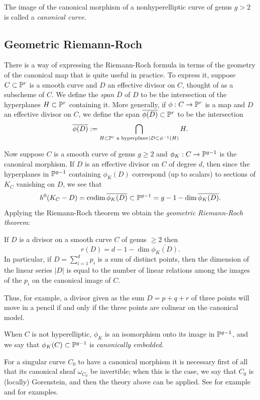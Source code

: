 The image of the canonical morphism of a nonhyperelliptic curve of genus $g>2$ is called a \emph{canonical curve}.


\subsection{Geometric Riemann-Roch}

There is a way of expressing the Riemann-Roch formula in terms of the geometry of the canonical map that is quite useful in practice. To express it, suppose $C \subset {\mathbb P}^r$ is a smooth curve and $D$ an effective divisor on $C$, thought of as a subscheme of $C$. We define the \emph{span} $\overline D$ of $D$ to be the intersection of the hyperplanes $H \subset {\mathbb P}^r$ containing it. More generally, if $\phi : C \to {\mathbb P}^r$ is a map and $D$ an effective divisor on $C$, we define the span $\overline{\phi(D)} \subset {\mathbb P}^r$ to be the intersection
$$
\overline{\phi(D)} := \bigcap_{H \subset {\mathbb P}^r \text{ a hyperplane}\kern1pt \mid D \subset \phi^{-1}(H)} H.
$$

Now suppose $C$ is a smooth curve of genus $g\geq 2$ and $\phi_K: C\to {\mathbb P}^{g-1}$ is the canonical morphism.
If  $D$ is an effective divisor on $C$ of degree $d$, then since the hyperplanes in ${\mathbb P}^{g-1}$ containing $\phi_K(D)$ correspond (up to scalars) to sections of $K_C$ vanishing on $D$, we see that
$$
h^0(K_C-D) = \operatorname{codim} \overline{ \phi_K(D)} \subset {\mathbb P}^{g-1}= g - 1 - \dim \overline{ \phi_K(D)}.
$$
Applying the Riemann-Roch theorem we obtain  the \emph{geometric Riemann-Roch theorem}:

\begin{corollary}\label{geometric RR}
If $D$ is a divisor on a smooth curve $C$ of genus $\geq 2$ then
$$
r(D) = d - 1 - \dim \overline{ \phi_K(D)}.
$$
In particular, if $D = \sum_{i=1}^dp_i$ is a sum of distinct points, then
 the dimension of the linear series $|D|$  is equal to the number of linear relations among the images of the $p_i$ on the canonical 
 image of $C$.
\end{corollary}

Thus, for example, a divisor given as the sum $D = p+q+r$ of three points will move in a pencil if and only if the three points are colinear on the canonical model.

When $C$ is not hyperelliptic, $\phi_K$ is an isomorphism onto its image in ${\mathbb P}^{g-1}$, and we say that $ \phi_K(C)\subset {\mathbb P}^{g-1}$ is \emph{canonically embedded}. 

\begin{remark}
For a singular curve $C_0$ to have a canonical morphism it is necessary first of all that its canonical sheaf
 $\omega_{C_0}$ be invertible; when this is the case, we say that $C_0$ is (locally) Gorenstein, and then
the theory above can be applied. See for example \cite{graphcurves} and \cite{ribbons} for examples. 
\end{remark}

